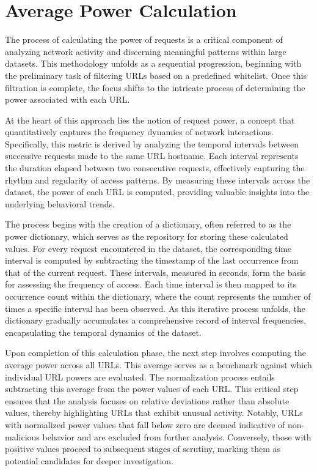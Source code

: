 \section{Average Power Calculation}
The process of calculating the power of requests is a critical component of analyzing network activity and discerning meaningful patterns within large datasets. This methodology unfolds as a sequential progression, beginning with the preliminary task of filtering URLs based on a predefined whitelist. Once this filtration is complete, the focus shifts to the intricate process of determining the power associated with each URL.

At the heart of this approach lies the notion of request power, a concept that quantitatively captures the frequency dynamics of network interactions. Specifically, this metric is derived by analyzing the temporal intervals between successive requests made to the same URL hostname. Each interval represents the duration elapsed between two consecutive requests, effectively capturing the rhythm and regularity of access patterns. By measuring these intervals across the dataset, the power of each URL is computed, providing valuable insights into the underlying behavioral trends.

The process begins with the creation of a dictionary, often referred to as the power dictionary, which serves as the repository for storing these calculated values. For every request encountered in the dataset, the corresponding time interval is computed by subtracting the timestamp of the last occurrence from that of the current request. These intervals, measured in seconds, form the basis for assessing the frequency of access. Each time interval is then mapped to its occurrence count within the dictionary, where the count represents the number of times a specific interval has been observed. As this iterative process unfolds, the dictionary gradually accumulates a comprehensive record of interval frequencies, encapsulating the temporal dynamics of the dataset.

Upon completion of this calculation phase, the next step involves computing the average power across all URLs. This average serves as a benchmark against which individual URL powers are evaluated. The normalization process entails subtracting this average from the power values of each URL. This critical step ensures that the analysis focuses on relative deviations rather than absolute values, thereby highlighting URLs that exhibit unusual activity. Notably, URLs with normalized power values that fall below zero are deemed indicative of non-malicious behavior and are excluded from further analysis. Conversely, those with positive values proceed to subsequent stages of scrutiny, marking them as potential candidates for deeper investigation.

